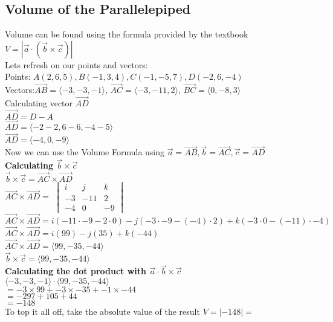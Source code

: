 \documentclass{article}
\begin{document}
\subsection{Volume of the Parallelepiped}
Volume can be found using the formula provided by the textbook $V=|\vec{a}\cdot (\vec{b}\times \vec{c})|$
\\Lets refresh on our points and vectors: 
\\Points: $A(2, 6, 5), B(-1, 3, 4), C(-1, -5, 7), D(-2,6,-4)$
\\Vectors:$\vec{AB}=\langle-3,-3,-1\rangle$, $\vec{AC}=\langle-3,-11,2\rangle$, $\vec{BC}=\langle0,-8,3\rangle$
\\Calculating vector $\vec{AD}$
\\$\vec{AD} = D-A$
\\$\vec{AD} = \langle-2-2,6-6, -4-5\rangle$
\\$\vec{AD} = \langle-4,0, -9\rangle$
\\Now we can use the Volume Formula using $\vec{a} = \vec{AB}, \vec{b} = \vec{AC}, \vec{c} = \vec{AD}$
\\\textbf{Calculating $\vec{b}\times\vec{c}$}
\\[0.1in]$\vec{b}\times\vec{c} = \vec{AC}\times\vec{AD}$
\\[0.1in]$\vec{AC} \times \vec{AD} = $
$\begin{vmatrix}
i & j & k \\
-3 & -11 & 2\\
-4 & 0 & -9
\end{vmatrix}$
\\[0.1in]$\vec{AC} \times \vec{AD} = i(-11\cdot-9-2\cdot 0)-j(-3\cdot -9-(-4)\cdot 2)+k(-3\cdot0-(-11)\cdot -4)$
\\[0.1in]$\vec{AC} \times \vec{AD} = i(99)-j(35)+k(-44)$
\\[0.1in]$\vec{AC} \times \vec{AD} = \langle99,-35,-44\rangle$
\\[0.1in]$\vec{b} \times \vec{c} = \langle99,-35,-44\rangle$
\\[0.1in]\textbf{Calculating the dot product with $\vec{a} \cdot \vec{b}\times\vec{c}$}
\\[0.1in]$\langle-3,-3,-1\rangle\cdot\langle99,-35,-44\rangle$
\\[0.1in]$=-3\times99+-3\times-35+-1\times-44$
\\[0.1in]$=-297+105+44$
\\[0.1in]$=-148$
\\[0.1in]To top it all off, take the absolute value of the result $V= |-148| =$ 
\end{document}
